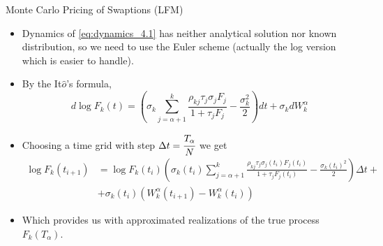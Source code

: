 \documentclass{beamer}
\begin{document}
\begin{frame}{Monte Carlo Pricing of Swaptions (LFM)}
  \begin{itemize}
  \item<1-> Dynamics of \cref{eq:dynamics_4.1} has neither analytical solution nor known distribution, so we need to use the Euler scheme (actually the log version which is easier to handle).
  \item<2-> By the It$\hat{o}$’s formula,
    \begin{equation*}
      d\log F_k(t) = \left(\sigma_k\sum_{j=\alpha+1}^k\frac{\rho_{kj}\tau_j\sigma_jF_j}{1+\tau_jF_j}-\frac{\sigma_k^2}{2}\right)dt+\sigma_k dW^\alpha_k
    \end{equation*}
  \item<3-> Choosing a time grid with step $\Delta t = \cfrac{T_\alpha}{N}$ we get
    \begin{equation*}
      \begin{aligned}
        \log F_k(t_{i+1}) &=\log F_k(t_i) \left(\sigma_k(t_i)\sum_{j=\alpha+1}^k\frac{\rho_{kj}\tau_j\sigma_j(t_i)F_j(t_i)}{1+\tau_jF_j(t_i)}-\frac{\sigma_k(t_i)^2}{2}\right)\Delta t + \\
        &+\sigma_k(t_i) (W^\alpha_k(t_{i+1}) - W^\alpha_k(t_i))
      \end{aligned}
    \end{equation*}
  \item<4-> Which provides us with approximated realizations of the true process $F_k(T_\alpha)$.
  \end{itemize}
\end{frame}

\end{document}
